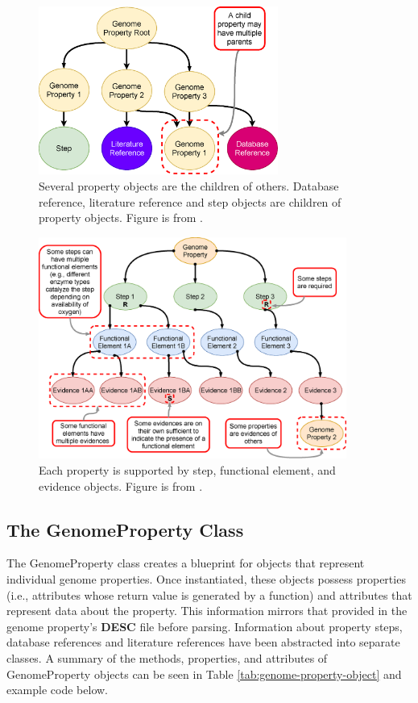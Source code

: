 \begin{figure}[!ht]
  \centering
	\includegraphics[width=0.70\textwidth]{media/Figure_1A.eps}
	 \caption{Several property objects are the children of others. Database reference, literature reference and step objects are children of property objects. Figure is from \cite{bergstrand2019pygenprop}.}
	 \label{fig:propertytree}
\end{figure}

\begin{figure}[!ht]
  \centering
	\includegraphics[width=0.90\textwidth]{media/Figure_1B.eps}
	 \caption{Each property is supported by step, functional element, and evidence objects. Figure is from \cite{bergstrand2019pygenprop}.}
	 \label{fig:property}
\end{figure}

\subsection{The GenomeProperty Class} \label{genome-property-class}

The GenomeProperty class creates a blueprint for objects that represent individual genome properties. Once instantiated, these objects possess properties (i.e., attributes whose return value is generated by a function) and attributes that represent data about the property. This information mirrors that provided in the genome property's \textbf{DESC} file before parsing. Information about property steps, database references and literature references have been abstracted into separate classes. A summary of the methods, properties, and attributes of GenomeProperty objects can be seen in Table \ref{tab:genome-property-object} and example code below.

